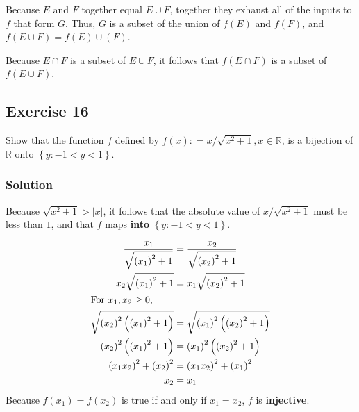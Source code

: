 \documentclass[12pt]{article}
\begin{document}
\begin{flushleft}
Because $E$ and $F$ together equal $E \cup F$, together they exhaust all of the inputs to $f$ that form $G$. Thus, $G$ is a subset of the union of $f\left(E\right)$ and $f\left(F\right)$, and $f\left(E \cup F\right) = f\left(E\right) \cup \left(F\right)$.

Because $E \cap F$ is a subset of $E \cup F$, it follows that $f\left(E \cap F\right)$ is a subset of $f\left(E \cup F\right)$.

\subsection*{Exercise 16}
Show that the function $f$ defined by $f\left(x\right) \mathrel{\mathop:}= x / \sqrt{x^2 + 1}, x \in \mathbb{R}$, is a bijection of $\mathbb{R}$ onto $\left\{y : -1 < y < 1\right\}$.
\subsubsection*{Solution}
Because $\sqrt{x^2 + 1} > \left|x\right|$, it follows that the absolute value of $x / \sqrt{x^2 + 1}$ must be less than $1$, and that $f$ maps \textbf{into} $\left\{y : -1 < y < 1\right\}$.



\begin{align*}
\frac{x_1}{\sqrt{\left(x_1\right)^2 + 1}} &= \frac{x_2}{\sqrt{\left(x_2\right)^2 + 1}} \\
x_2\sqrt{\left(x_1\right)^2 + 1} &= x_1\sqrt{\left(x_2\right)^2 + 1} \\
\intertext{For $x_1, x_2 \geq 0$,}
\sqrt{\left(x_2\right)^2\left(\left(x_1\right)^2 + 1\right)} &= \sqrt{\left(x_1\right)^2\left(\left(x_2\right)^2 + 1\right)} \\
\left(x_2\right)^2\left(\left(x_1\right)^2 + 1\right) &= \left(x_1\right)^2\left(\left(x_2\right)^2 + 1\right) \\
\left(x_1 x_2\right)^2 + \left(x_2\right)^2 &= \left(x_1 x_2\right)^2 + \left(x_1\right)^2 \\
x_2 &= x_1
\end{align*}
Because $f\left(x_1\right) = f\left(x_2\right)$ is true if and only if $x_1 = x_2$, $f$ is \textbf{injective}.


\end{flushleft}
\end{document}
